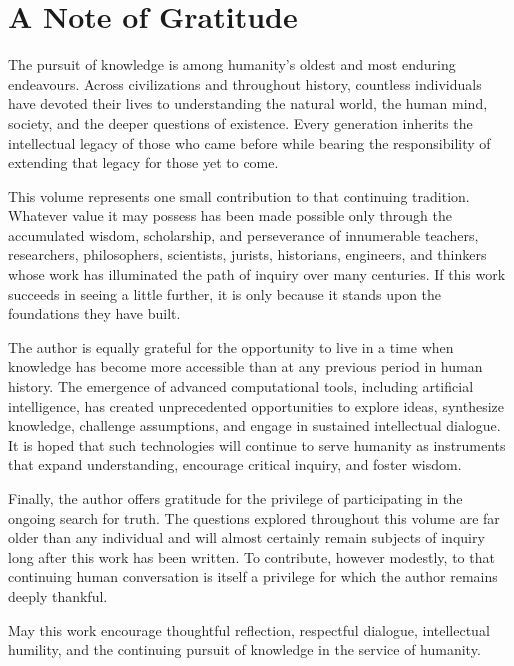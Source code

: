\clearpage
\section*{A Note of Gratitude}

The pursuit of knowledge is among humanity's oldest and most enduring endeavours. Across civilizations and throughout history, countless individuals have devoted their lives to understanding the natural world, the human mind, society, and the deeper questions of existence. Every generation inherits the intellectual legacy of those who came before while bearing the responsibility of extending that legacy for those yet to come.

This volume represents one small contribution to that continuing tradition. Whatever value it may possess has been made possible only through the accumulated wisdom, scholarship, and perseverance of innumerable teachers, researchers, philosophers, scientists, jurists, historians, engineers, and thinkers whose work has illuminated the path of inquiry over many centuries. If this work succeeds in seeing a little further, it is only because it stands upon the foundations they have built.

The author is equally grateful for the opportunity to live in a time when knowledge has become more accessible than at any previous period in human history. The emergence of advanced computational tools, including artificial intelligence, has created unprecedented opportunities to explore ideas, synthesize knowledge, challenge assumptions, and engage in sustained intellectual dialogue. It is hoped that such technologies will continue to serve humanity as instruments that expand understanding, encourage critical inquiry, and foster wisdom.


Finally, the author offers gratitude for the privilege of participating in the ongoing search for truth. The questions explored throughout this volume are far older than any individual and will almost certainly remain subjects of inquiry long after this work has been written. To contribute, however modestly, to that continuing human conversation is itself a privilege for which the author remains deeply thankful.

May this work encourage thoughtful reflection, respectful dialogue, intellectual humility, and the continuing pursuit of knowledge in the service of humanity.


